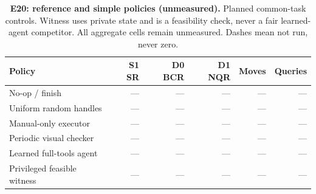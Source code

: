 \begin{table}[!ht]
\centering\small
\caption{\textbf{E20: reference and simple policies (unmeasured).} Planned common-task controls. Witness uses private state and is a feasibility check, never a fair learned-agent competitor. All aggregate cells remain unmeasured. Dashes mean not run, never zero.}
\begin{tabularx}{\textwidth}{@{}Xrrrrr@{}}\toprule
Policy & S1 SR & D0 BCR & D1 NQR & Moves & Queries\\\midrule
No-op / finish & --- & --- & --- & --- & ---\\
Uniform random handles & --- & --- & --- & --- & ---\\
Manual-only executor & --- & --- & --- & --- & ---\\
Periodic visual checker & --- & --- & --- & --- & ---\\
Learned full-tools agent & --- & --- & --- & --- & ---\\
Privileged feasible witness & --- & --- & --- & --- & ---\\
\bottomrule
\end{tabularx}
\end{table}

